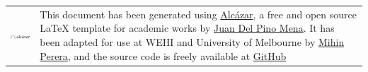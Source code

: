



\begingroup

    \vspace*{2mm}

    \setlength\tabcolsep{0pt}
    \renewcommand*{\arraystretch}{1.4}
    \renewcommand{\baselinestretch}{0.9}\footnotesize  %
    
    \noindent
    \begin{tabular}{m{3.5cm} m{11.5cm}}
        \includegraphics[width=3cm]{opening/resources/logos/alcazar.pdf} & \noindent This document has been generated using {\href{https://github.com/dpmj/alcazar}{Alcázar}}, a free and open source {\LaTeX} template for academic works by \href{https://www.linkedin.com/in/dpmj/}{Juan Del Pino Mena}. It has been adapted for use at WEHI and University of Melbourne by \href{https://www.linkedin.com/in/mihinperera1040/}{Mihin Perera}, and the source code is freely available at {\href{https://github.com/MihinP/WEHI_Latex_Template}{GitHub}} \\
    \end{tabular}

    

\endgroup



